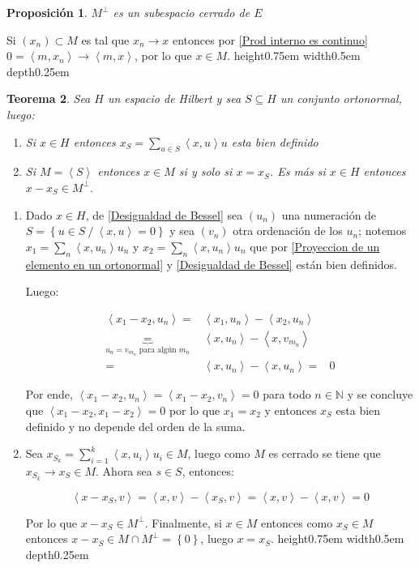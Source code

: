 \documentclass[11pt]{article}
\newcommand{\N}{{\mathbb{N}}}
\newcommand{\ip}[1]{\left\langle#1\right\rangle}
\newcommand{\sett}[1]{\left\lbrace#1\right\rbrace}
\newcommand{\Bigsum}[2]{\sum\limits_{#1}{#2}}
\newtheorem{theorem}{Teorema}
\numberwithin{theorem}{subsection}
\newtheorem{proposition}[theorem]{Proposici\'on}
\newenvironment{proof}[1][Demostraci\'on]{\begin{trivlist}
		\item[\hskip \labelsep {\bfseries #1}]}{\end{trivlist}}
\newcommand{\qed}{\nobreak \ifvmode \relax \else
	\ifdim\lastskip<1.5em \hskip-\lastskip
	\hskip1.5em plus0em minus0.5em \fi \nobreak
	\vrule height0.75em width0.5em depth0.25em\fi}
\begin{document}
\begin{proposition}
	\label{El ortogonal es cerrado}
	$M^{\perp}$ es un subespacio cerrado de $E$
\end{proposition}

\begin{proof}
	Si $(x_n) \subset M$ es tal que $x_n \rightarrow x$ entonces por \ref{Prod interno es continuo} $0 = \ip{m,x_n} \rightarrow \ip{m,x}$, por lo que $x \in M$. \qed
\end{proof}

\begin{theorem}
	\label{Proyeccion a un conjunto ortonormal arbitrario}
	Sea $H$ un espacio de Hilbert y sea $S \subseteq H$ un conjunto ortonormal, luego:
	
	\begin{enumerate}
		\item Si $x \in H$ entonces $x_S = \Bigsum{u \in S}{\ip{x,u}u}$ esta bien definido
		\item Si $M = \ip{S}$ entonces $x \in M$ si y solo si $x = x_S$. Es m\'as si $x \in H$ entonces $x - x_S \in M^{\perp}$.
	\end{enumerate}
\end{theorem}

\begin{proof}
	\begin{enumerate}
		\item 	Dado $x \in H$, de \ref{Desigualdad de Bessel} sea $(u_n)$ una numeraci\'on de $S = \sett{u \in S \ / \ \ip{x,u}=0}$ y sea $(v_n)$ otra ordenaci\'on de los $u_n$; notemos $x_1 = \Bigsum{n}{\ip{x,u_n}u_n}$ y $x_2 = \Bigsum{n}{\ip{x,u_n}u_n}$ que por \ref{Proyeccion de un elemento en un ortonormal} y \ref{Desigualdad de Bessel} est\'an bien definidos.
	
	Luego:
	
	\[
	\begin{aligned}
		\ip{x_1 - x_2 , u_n} = & \ip{x_1,u_n} - \ip{x_2,u_n} \\
		\underbrace{=}_{u_n = v_{m_n} \text{ para alg\'un } m_n} & \ip{x,u_n} - \ip{x,v_{m_n}} \\
		= & \ip{x,u_n} - \ip{x,u_n}
		= & 0
	\end{aligned}
	\]
	
	Por ende, $\ip{x_1 - x_2,u_n} = \ip{x_1 - x_2,v_n} = 0 $ para todo $n \in \N$ y se concluye que $\ip{x_1 - x_2 , x_1 - x_2} = 0$ por lo que $x_1 = x_2$ y entonces $x_S$ esta bien definido y no depende del orden de la suma.
	
	\item Sea $x_{S_k} = \sum\limits_{i=1}^{k}\ip{x,u_i}u_i \in M$, luego como $M$ es cerrado se tiene que $x_{S_k} \rightarrow x_S \in M$. Ahora sea $s \in S$, entonces:
	
	\[
	\ip{x-x_S,v} = \ip{x,v} - \ip{x_S,v} = \ip{x,v} - \ip{x,v} = 0
	\]
	
	Por lo que $x - x_S \in M^{\perp}$. Finalmente, si $x \in M$ entonces como $x_S \in M$ entonces $x - x_S \in M \cap M^{\perp} = \sett{0}$, luego $x = x_S$. \qed
	
	\end{enumerate}
	
\end{proof}
\end{document}
